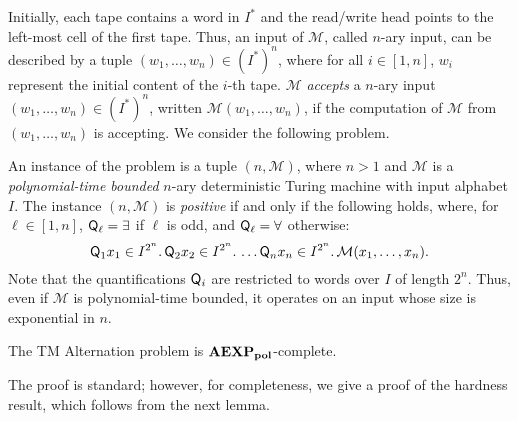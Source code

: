 Initially, each tape contains a word in $I^{*}$ and the read/write
head points to the left-most cell of the first tape. Thus, an input of $\mathcal{M}$, called $n$-ary input, can be described by a tuple
 $(w_1,\ldots,w_n)\in (I^{*})^{n}$, where for all $i\in [1,n]$, $w_i$ represent the initial content of the $i$-th tape.
 $\mathcal{M}$ \emph{accepts} a $n$-ary input $(w_1,\ldots,w_n)\in (I^{*})^{n}$,  written $\mathcal{M}(w_1,\ldots,w_n)$, if the computation of $\mathcal{M}$ from $(w_1,\ldots,w_n)$  is accepting.  We consider the following problem.

\begin{definition} 
An instance of the problem is a tuple $(n,\mathcal{M})$, where  $n>1$  and  $\mathcal{M}$ is a  \emph{polynomial-time bounded} $n$-ary deterministic Turing machine with input alphabet $I$. The instance $(n,\mathcal{M})$ is \emph{positive} if and only if the following holds,  where,
for  $\ell\in [1,n]$,
$\text{{\sffamily Q}}_\ell=\exists$ if $\ell$ is odd, and $\text{{\sffamily Q}}_\ell=\forall$ otherwise:
\[
\text{{\sffamily Q}}_1 x_1\in I^{2^{n}}.\, \text{{\sffamily Q}}_2 x_2\in I^{2^{n}}.\,\ldots \text{{\sffamily Q}}_n x_n\in I^{2^{n}}. \, \mathcal{M}(x_1,\ldots,x_n).
\]
 Note that the quantifications $\text{{\sffamily Q}}_i$ are restricted to words over $I$ of length ${2^{n}}$. Thus, even if $\mathcal{M}$ is polynomial-time bounded, it operates on an input  whose size is exponential in $n$.
\end{definition}

\begin{proposition}\label{prop:SuitableCompleteProblem}
The TM Alternation problem is $\mathbf{AEXP_{pol}}$-complete.
\end{proposition}

The proof is standard; however, for  completeness, we give a proof of the hardness result, which follows from the next lemma.

